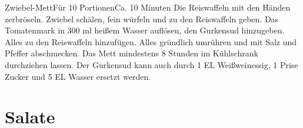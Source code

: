 \documentclass[a4paper,10pt]{article}
\begin{document}
    \newpage
    
    \begin{recipe}{Zwiebel-Mett}{Für 10 Portionen}{Ca. 10 Minuten}
        Die Reiswaffeln mit den Händen zerbröseln. Zwiebel schälen, fein würfeln und zu den Reiswaffeln geben.
        Das Tomatenmark in 300 ml heißem Wasser auflösen, den Gurkensud hinzugeben. Alles zu den Reiswaffeln 
        hinzufügen.
        Alles gründlich umrühren und mit Salz und Pfeffer abschmecken. Das Mett mindestens 8 Stunden im
        Kühlschrank durchziehen lassen.
        \freeform Der Gurkensud kann auch durch 1 EL Weißweinessig, 1 Prise 
        Zucker und 5 EL Wasser ersetzt werden.

        \freeform \hfill 

    \end{recipe}

    \newpage

  
    \section{Salate}
    
\end{document}
